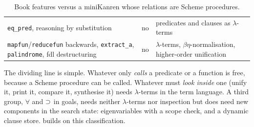 \begin{table}[ht]
\begin{tabular}{@{}>{\raggedright\arraybackslash}p{0.40\fullwidthlen}>{\raggedright\arraybackslash}p{0.17\fullwidthlen}>{\raggedright\arraybackslash}p{0.36\fullwidthlen}@{}}
\texttt{eq\_pred}, reasoning by substitution & no & predicates and clauses as $\lambda$-terms\\
\texttt{mapfun}/\texttt{reducefun} backwards, \texttt{extract\_a}, \texttt{palindrome}, fdl destructuring & no & $\lambda$-terms, $\beta\eta$-normalisation, higher-order unification\\
\bottomrule
\end{tabular}\par\vspace{14pt}%
\caption{Book features versus a miniKanren whose relations are Scheme procedures.}\label{tab:hoprog-free}
\end{table}

The dividing line is simple. Whatever only \emph{calls} a predicate or a function is free, because a
Scheme procedure can be called. Whatever must \emph{look inside} one (unify it, print it, compare it,
synthesise it) needs $\lambda$-terms in the term language. A third group, $\forall$ and $\supset$ in goals,
needs neither $\lambda$-terms nor inspection but does need new components in the search state:
eigenvariables with a scope check, and a dynamic clause store.  builds on this
classification.

